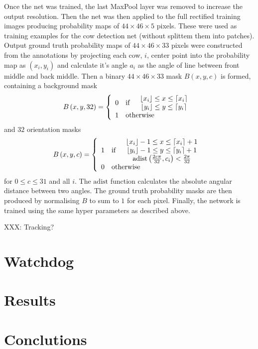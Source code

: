\documentclass[10pt,a4paper,twocolumn]{article}
\begin{document}
Once the net was trained, the last MaxPool layer was removed to increase the output resolution. Then the net was then applied to the full rectified training images producing probability maps of $44\times 46\times 5$ pixels. These were used as training examples for the cow detection net (without splittem them into patches). Output ground truth probability maps of $44\times 46\times 33$ pixels were constructed from the annotations by projecting each cow, $i$, center point into the probability map as $\left( x_i, y_i \right)$ and calculate it's angle $a_i$ as the angle of line between front middle and back middle. Then a binary $44\times 46\times 33$ mask $B\left( x, y, c \right)$ is formed, containing a background mask
\begin{equation}
B\left( x, y, 32 \right) = \left\lbrace 
\begin{array}{clc}
0 & \text{if} & 
\begin{array}{c}
 \lfloor x_i \rfloor \leq x \leq \lceil x_i \rceil \\ 
 \lfloor y_i \rfloor \leq y \leq \lceil y_i \rceil
\end{array} 
\\ 
1 & \multicolumn{2}{l}{\text{otherwise}} 
\end{array} 
\right. 
\end{equation}
and $32$ orientation masks
\begin{equation}
B\left( x, y, c \right) = \left\lbrace 
\begin{array}{clc}
1 & \text{if} & 
\begin{array}{c}
 \lfloor x_i \rfloor-1 \leq x \leq \lceil x_i \rceil+1 \\ 
 \lfloor y_i \rfloor-1 \leq y \leq \lceil y_i \rceil+1 \\
 \mathrm{adist}\left(\frac{2c\pi}{32}, c_i\right) < \frac{2\pi}{32} \\
\end{array} 
\\ 
0 & \multicolumn{2}{l}{\text{otherwise}} 
\end{array} 
\right. 
\end{equation}
for $0\leq c \leq 31$ and all $i$. The $\mathrm{adist}$ function calculates the absolute angular distance between two angles. The ground truth probability masks are then produced by normalising $B$ to sum to $1$ for each pixel. Finally, the network is trained using the same hyper parameters as described above.

XXX: Tracking?

\section{Watchdog}

\section{Results}

\section{Conclutions}



\end{document}
